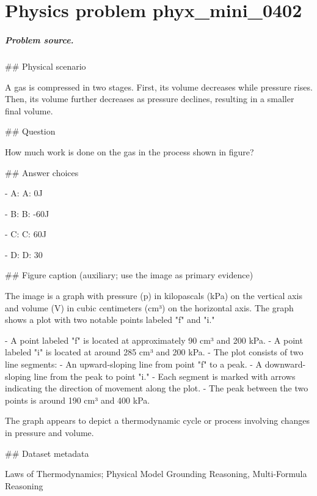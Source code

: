 
\chapter{Physics problem phyx\_mini\_0402}
\label{ch:PhyXMiniProblems_problem_phyx_mini_0402}

\paragraph{Problem source.}
\#\# Physical scenario

A gas is compressed in two stages. First, its volume decreases while pressure rises. Then, its volume further decreases as pressure declines, resulting in a smaller final volume.

\#\# Question

How much work is done on the gas in the process shown in figure?

\#\# Answer choices

- A: A: 0J

- B: B: -60J

- C: C: 60J

- D: D: 30

\#\# Figure caption (auxiliary; use the image as primary evidence)

The image is a graph with pressure (p) in kilopascals (kPa) on the vertical axis and volume (V) in cubic centimeters (cm³) on the horizontal axis. The graph shows a plot with two notable points labeled "f" and "i." 

- A point labeled "f" is located at approximately 90 cm³ and 200 kPa.
- A point labeled "i" is located at around 285 cm³ and 200 kPa.
- The plot consists of two line segments: 
  - An upward-sloping line from point "f" to a peak.
  - A downward-sloping line from the peak to point "i." 
- Each segment is marked with arrows indicating the direction of movement along the plot. 
- The peak between the two points is around 190 cm³ and 400 kPa. 

The graph appears to depict a thermodynamic cycle or process involving changes in pressure and volume.

\#\# Dataset metadata

Laws of Thermodynamics; Physical Model Grounding Reasoning, Multi-Formula Reasoning

